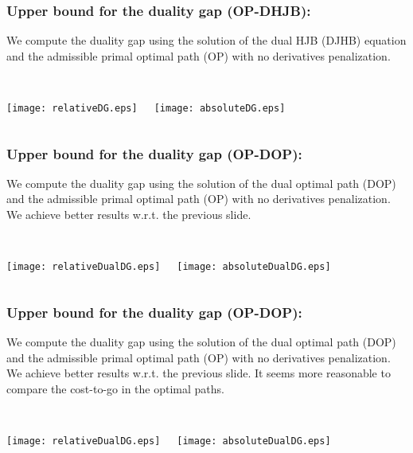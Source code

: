 \documentclass[aspectratio=169]{beamer}\usepackage[utf8]{inputenc}
\begin{document}
\begin{frame}
\frametitle{Upper bound for the duality gap (\textbf{OP-DHJB}):}

We compute the duality gap using the solution of the dual HJB (DJHB) equation and the admissible primal optimal path (OP) with no derivatives penalization.\\
\quad\\
\begin{columns}[c]

{\texttt{[image: relativeDG.eps]}}

{\texttt{[image: absoluteDG.eps]}}

\end{columns}  
 
\end{frame}

\begin{frame}
\frametitle{Upper bound for the duality gap (\textbf{OP-DOP}):}

We compute the duality gap using the solution of the dual optimal path (DOP) and the admissible primal optimal path (OP) with no derivatives penalization. We achieve better results w.r.t. the previous slide.\\
\quad\\ 
\begin{columns}[c]

{\texttt{[image: relativeDualDG.eps]}}

{\texttt{[image: absoluteDualDG.eps]}}

\end{columns} 

\end{frame}

\begin{frame}
\frametitle{Upper bound for the duality gap (\textbf{OP-DOP}):}

We compute the duality gap using the solution of the dual optimal path (DOP) and the admissible primal optimal path (OP) with no derivatives penalization. We achieve better results w.r.t. the previous slide. It seems more reasonable to compare the cost-to-go in the optimal paths.\\
\quad\\ 
\begin{columns}[c]

{\texttt{[image: relativeDualDG.eps]}}

{\texttt{[image: absoluteDualDG.eps]}}

\end{columns} 

\end{frame}
\end{document}
